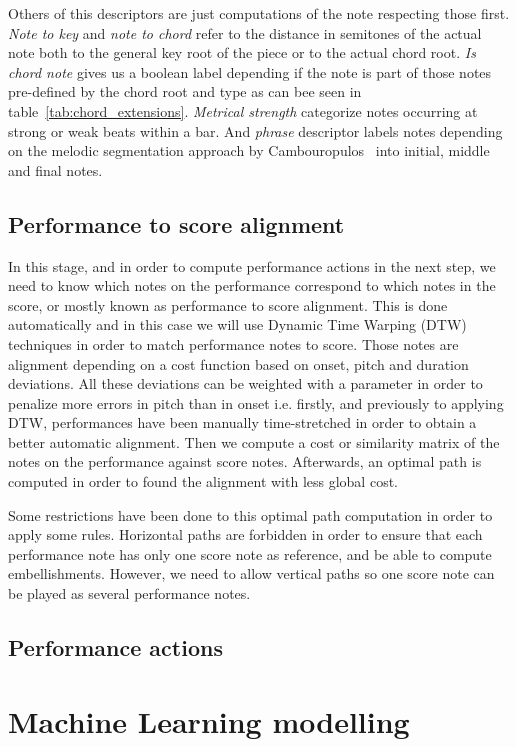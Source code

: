 \begin{itemize}
Others of this descriptors are just computations of the note respecting those first. \textit{Note to key} and \textit{note to chord} refer to the distance in semitones of the actual note both to the general key root of the piece or to the actual chord root. \textit{Is chord note} gives us a boolean label depending if the note is part of those notes pre-defined by the chord root and type as can bee seen in table~\ref{tab:chord_extensions}. \textit{Metrical strength} categorize notes occurring at strong or weak beats within a bar. And \textit{phrase} descriptor labels notes depending on the melodic segmentation approach by Cambouropulos~\cite{Cambouropoulos1997a} into initial, middle and final notes.

\end{itemize}



\subsection{Performance to score alignment}
In this stage, and in order to compute performance actions in the next step, we need to know which notes on the performance correspond to which notes in the score, or mostly known as performance to score alignment. This is done automatically and in this case we will use Dynamic Time Warping (DTW) techniques in order to match performance notes to score. Those notes are alignment depending on a cost function based on onset, pitch and duration deviations. All these deviations can be weighted with a parameter in order to penalize more errors in pitch than in onset i.e. firstly, and previously to applying DTW, performances have been manually time-stretched in order to obtain a better automatic alignment. Then we compute a cost or similarity matrix of the notes on the performance against score notes. Afterwards, an optimal path is computed in order to found the alignment with less global cost.

Some restrictions have been done to this optimal path computation in order to apply some rules. Horizontal paths are forbidden in order to ensure that each performance note has only one score note as reference, and be able to compute embellishments. However, we need to allow vertical paths so one score note can be played as several performance notes.  
\subsection{Performance actions}

\section{Machine Learning modelling}
\cleardoublepage

